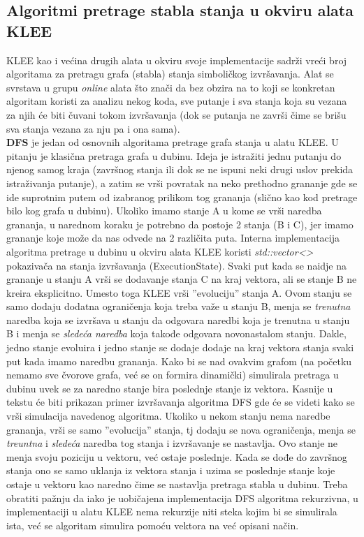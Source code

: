 \documentclass[12pt]{article}
\begin{document}
\subsection{Algoritmi pretrage stabla stanja u okviru alata KLEE}
KLEE kao i većina drugih alata u okviru svoje implementacije sadrži vreći broj algoritama za pretragu grafa (stabla) stanja simboličkog izvršavanja. Alat se svrstava u grupu \textit{online} alata što znači da bez obzira na to koji se konkretan algoritam koristi za analizu nekog koda, sve putanje i sva stanja koja su vezana za njih će biti čuvani tokom izvršavanja (dok se putanja ne završi čime se brišu sva stanja vezana za nju pa i ona sama).\newline
\\
\textbf{DFS} je jedan od osnovnih algoritama pretrage grafa stanja u alatu KLEE. U pitanju je klasična pretraga grafa u dubinu. Ideja je istražiti jednu putanju do njenog samog kraja (završnog stanja ili dok se ne ispuni neki drugi uslov prekida istraživanja putanje), a zatim se vrši povratak na neko prethodno grananje gde se ide suprotnim putem od izabranog prilikom tog grananja (slično kao kod pretrage bilo kog grafa u dubinu). Ukoliko imamo stanje A u kome se vrši naredba grananja, u narednom koraku je potrebno da postoje 2 stanja (B i C), jer imamo grananje koje može da nas odvede na 2 različita puta. Interna implementacija algoritma pretrage u dubinu u okviru alata KLEE koristi \textit{std::vector<>} pokazivača na stanja izvršavanja (ExecutionState). Svaki put kada se naidje na grananje u stanju A vrši se dodavanje stanja C na kraj vektora, ali se stanje B ne kreira eksplicitno. Umesto toga KLEE vrši ''evoluciju'' stanja A. Ovom stanju se samo dodaju dodatna ograničenja koja treba važe u stanju B, menja se \textit{trenutna} naredba koja se izvršava u stanju da odgovara naredbi koja je trenutna u stanju B i menja se \textit{sledeća naredba} koja takođe odgovara novonastalom stanju. Dakle, jedno stanje evoluira i jedno stanje se dodaje dodaje na kraj vektora stanja svaki put kada imamo naredbu grananja. Kako bi se nad ovakvim grafom (na početku nemamo sve čvorove grafa, već se on formira dinamički) simulirala pretraga u dubinu uvek se za naredno stanje bira poslednje stanje iz vektora. Kasnije u tekstu će biti prikazan primer izvršavanja algoritma DFS gde će se videti kako se vrši simulacija navedenog algoritma. Ukoliko u nekom stanju nema naredbe grananja, vrši se samo ''evolucija'' stanja, tj dodaju se nova ograničenja, menja se \textit{treuntna} i \textit{sledeća} naredba tog stanja i izvršavanje se nastavlja. Ovo stanje ne menja svoju poziciju u vektoru, već ostaje poslednje. Kada se dođe do završnog stanja ono se samo uklanja iz vektora stanja i uzima se poslednje stanje koje ostaje u vektoru kao naredno čime se nastavlja pretraga stabla u dubinu. Treba obratiti pažnju da iako je uobičajena implementacija DFS algoritma rekurzivna, u implementaciji u alatu KLEE nema rekurzije niti steka kojim bi se simulirala ista, već se algoritam simulira pomoću vektora na već opisani način.\newline
\end{document}
